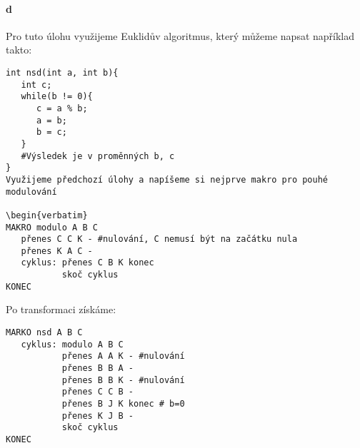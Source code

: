\documentclass[a4paper,12pt]{article}
\begin{document}
\paragraph{d} Pro tuto úlohu využijeme Euklidův algoritmus, který můžeme napsat například takto: 
\begin{verbatim}
int nsd(int a, int b){
   int c;
   while(b != 0){
      c = a % b;
      a = b;
      b = c;
   }
   #Výsledek je v proměnných b, c 
}
Využijeme předchozí úlohy a napíšeme si nejprve makro pro pouhé modulování

\begin{verbatim}
MAKRO modulo A B C
   přenes C C K - #nulování, C nemusí být na začátku nula
   přenes K A C -
   cyklus: přenes C B K konec
           skoč cyklus   
KONEC
\end{verbatim}
Po transformaci získáme: 
\begin{verbatim}
MARKO nsd A B C
   cyklus: modulo A B C
           přenes A A K - #nulování
           přenes B B A -
           přenes B B K - #nulování
           přenes C C B -
           přenes B J K konec # b=0
           přenes K J B -
           skoč cyklus
KONEC
\end{verbatim}
\end{document}

